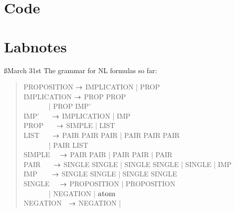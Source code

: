 \documentclass[a4paper]{article}
\begin{document}
\section{Code}

\section{Labnotes}
\ss{March 31st}
The grammar for NL formulas so far:
\begin{quote}
\ttfamily
PROPOSITION $\rightarrow$ IMPLICATION | PROP\\
IMPLICATION $\rightarrow$  PROP  PROP\\
\(~~~~~~~~~~~~~~~\) |
 PROP  IMP'\\
IMP' \(~~~~~~~\)$\rightarrow$ IMPLICATION | IMP \\
PROP \(~~~~~~~\)$\rightarrow$ SIMPLE | LIST \\
LIST \(~~~~~~~\)$\rightarrow$ PAIR\txt{, } PAIR PAIR |
                      PAIR\txt{, } PAIR PAIR\\
\(~~~~~~~~~~~~~~~\) | PAIR\txt{, } LIST\\
SIMPLE \(~~~~~\)$\rightarrow$ PAIR  PAIR |
                      PAIR  PAIR  | PAIR\\
PAIR \(~~~~~~~\)$\rightarrow$ SINGLE   SINGLE | SINGLE  SINGLE
                    | SINGLE | IMP\\
IMP \(~~~~~~~~\)$\rightarrow$ SINGLE  SINGLE
                    | SINGLE  SINGLE\\
SINGLE \(~~~~~\)$\rightarrow$ PROPOSITION |
                      PROPOSITION\\
\(~~~~~~~~~~~~~~~\) | NEGATION | {\bf atom}\\
NEGATION \(~~~\)$\rightarrow$ NEGATION | \\
\end{quote}
\end{document}
